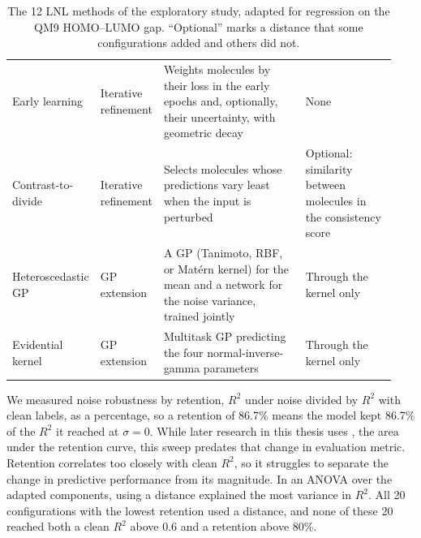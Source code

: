 \begin{table}[htbp]
\begin{adjustbox}{max width=\textwidth,max totalheight=0.85\textheight}
\begin{tabular}{@{}P{0.19\linewidth}P{0.13\linewidth}P{0.38\linewidth}P{0.24\linewidth}@{}}
Early learning & Iterative refinement & Weights molecules by their loss in the early epochs and, optionally, their uncertainty, with geometric decay & None \\
Contrast-to-divide & Iterative refinement & Selects molecules whose predictions vary least when the input is perturbed & Optional: similarity between molecules in the consistency score \\
Heteroscedastic GP & GP extension & A GP (Tanimoto, RBF, or Mat\'ern kernel) for the mean and a network for the noise variance, trained jointly & Through the kernel only \\
Evidential kernel & GP extension & Multitask GP predicting the four normal-inverse-gamma parameters & Through the kernel only \\
\bottomrule
\end{tabular}
\end{adjustbox}
\caption[Methods of the exploratory study of noise-handling methods.]{The 12 LNL methods of the exploratory study, adapted for regression on the QM9 HOMO--LUMO gap. ``Optional'' marks a distance that some configurations added and others did not.}
\label{tab:flaws:lnl_methods}
\end{table}


We measured noise robustness by retention, $R^2$ under noise divided by $R^2$ with clean labels, as a percentage, so a retention of 86.7\% means the model kept 86.7\% of the $R^2$ it reached at $\sigma = 0$. While later research in this thesis uses \aucnorm{}, the area under the retention curve, this sweep predates that change in evaluation metric.
 Retention correlates too closely with clean $R^2$, so it struggles to separate the change in predictive performance from its magnitude. In an ANOVA over the adapted components, using a distance explained the most variance in $R^2$. All 20 configurations with the lowest retention used a distance, and none of these 20 reached both a clean $R^2$ above 0.6 and a retention above 80\%.

